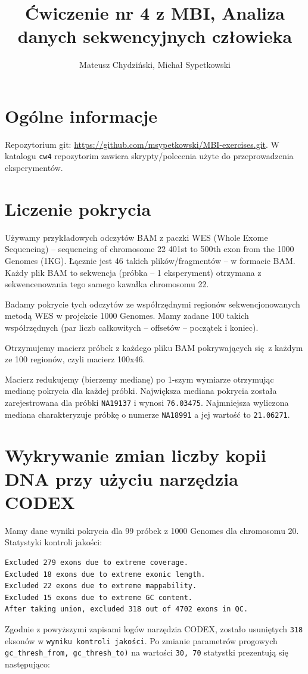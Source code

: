 \documentclass[a4paper]{article}
\begin{document}
\title{Ćwiczenie nr 4 z MBI, Analiza danych sekwencyjnych człowieka}
\author{Mateusz Chydziński, Michał Sypetkowski}
\maketitle

\section{Ogólne informacje}
Repozytorium git: \url{https://github.com/msypetkowski/MBI-exercises.git}.
W katalogu \texttt{cw4} repozytorim zawiera skrypty/polecenia użyte do przeprowadzenia eksperymentów.


\section{Liczenie pokrycia}

Używamy przykładowych odczytów BAM z paczki WES
(Whole Exome Sequencing)  -- sequencing of chromosome 22 401st to 500th exon from the 1000 Genomes (1KG).
Łącznie jest 46 takich plików/fragmentów -- w formacie BAM.
Każdy plik BAM to sekwencja (próbka -- 1 eksperyment) otrzymana z sekwencenowania tego samego kawałka chromosomu 22.

Badamy pokrycie tych odczytów ze współrzędnymi regionów sekwencjonowanych metodą WES
w projekcie 1000 Genomes. Mamy zadane 100 takich współrzędnych (par liczb całkowitych -- offsetów -- początek i koniec).

Otrzymujemy macierz próbek z każdego pliku BAM pokrywających się z każdym ze 100 regionów,
czyli macierz 100x46.

Macierz redukujemy (bierzemy medianę) po 1-szym wymiarze otrzymując medianę pokrycia dla każdej próbki.
Największa mediana pokrycia została zarejestrowana dla próbki \texttt{NA19137} i wynosi \texttt{76.03475}.
Najmniejsza wyliczona mediana charakteryzuje próbkę o numerze \texttt{NA18991} a jej wartość to \texttt{21.06271}.


\section{Wykrywanie zmian liczby kopii DNA przy użyciu narzędzia CODEX}

Mamy dane wyniki pokrycia dla 99 próbek z 1000 Genomes dla chromosomu 20.
Statystyki kontroli jakości:
\begin{verbatim}
Excluded 279 exons due to extreme coverage.
Excluded 18 exons due to extreme exonic length.
Excluded 22 exons due to extreme mappability.
Excluded 15 exons due to extreme GC content.
After taking union, excluded 318 out of 4702 exons in QC.
\end{verbatim}
Zgodnie z powyższymi zapisami logów narzędzia CODEX, zostało usuniętych \texttt{318} eksonów w \texttt{wyniku kontroli jakości}.
Po zmianie parametrów progowych \texttt{gc\_thresh\_from, gc\_thresh\_to)} na wartości \texttt{30, 70} statystki prezentują się następująco:
\end{document}
